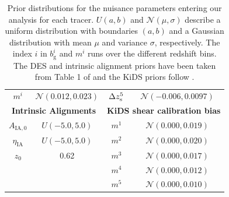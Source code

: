 \documentclass[a4paper,11pt]{article}
\newcommand{\cN}{\mathcal{N}}
\begin{document}
\begin{table}
\begin{tabular}{|cc|cc|}
        $m^i $ & $\cN (0.012, 0.023)$                         &    $\Delta z_{{\rm s}}^5 $  & $\cN (-0.006, 0.0097)$\\ 
        \cline{1-2}
        \multicolumn{2}{|c|}{\textbf{Intrinsic Alignments}} &       \multicolumn{2}{c|}{\textbf{KiDS shear calibration bias}}\\
        $A_\mathrm{IA,0} $ & $U(-5.0, 5.0)$&                       $m^1 $  & $\cN (0.000, 0.019)$ \\
        $\eta_\mathrm{IA}$ & $U (-5.0, 5.0)$&                      $m^2 $  & $\cN (0.000, 0.020)$ \\
        $z_0$ & 0.62&                                              $m^3 $  & $\cN (0.000, 0.017)$ \\             
        & &                                                        $m^4 $  & $\cN (0.000, 0.012)$ \\ 
        & &                                                        $m^5 $  & $\cN (0.000, 0.010)$ \\
        \hline
        \end{tabular}
        \caption{Prior distributions for the nuisance parameters entering our analysis for each tracer. $U(a, b)$ and $\cN(\mu, \sigma)$ describe a uniform distribution with boundaries $(a, b)$ and a Gaussian distribution with mean $\mu$ and variance $\sigma$, respectively.  The index $i$ in $b^i_\mathrm{g}$ and $m^i$ runs over the different redshift bins. The DES and intrinsic alignment priors have been taken from Table 1 of  \cite{1810.02322} and the KiDS priors follow \cite{2007.15633}.}\label{tab:priors_nuisance}
      \end{table}
\end{document}
